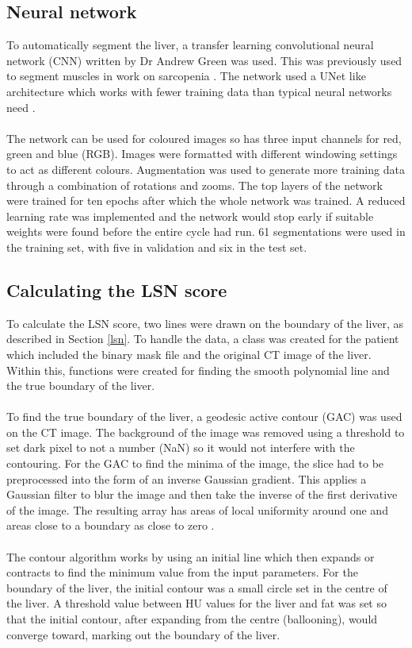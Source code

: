 \documentclass[12pt]{article}
\begin{document}
\subsection{Neural network}
To automatically segment the liver, a transfer learning convolutional neural network (CNN) written by Dr Andrew Green was used. This was previously used to segment muscles in work on sarcopenia \cite{Green:2019aa}. The network used a UNet like architecture which works with fewer training data than typical neural networks need \cite{2015arXiv150504597R}.
\\ \\
The network can be used for coloured images so has three input channels for red, green and blue (RGB). Images were formatted with different windowing settings to act as different colours. Augmentation was used to generate more training data through a combination of rotations and zooms. The top layers of the network were trained for ten epochs after which the whole network was trained. A reduced learning rate was implemented and the network would stop early if suitable weights were found before the entire cycle had run. 61 segmentations were used in the training set, with five in validation and six in the test set. 


\subsection{Calculating the LSN score}
To calculate the LSN score, two lines were drawn on the boundary of the liver, as described in Section \ref{lsn}. To handle the data, a class was created for the patient which included the binary mask file and the original CT image of the liver. Within this, functions were created for finding the smooth polynomial line and the true boundary of the liver.
\\ \\
To find the true boundary of the liver, a geodesic active contour (GAC) was used on the CT image. The background of the image was removed using a threshold to set dark pixel to not a number (NaN) so it would not interfere with the contouring. For the GAC to find the minima of the image, the slice had to be preprocessed into the form of an inverse Gaussian gradient. This applies a Gaussian filter to blur the image and then take the inverse of the first derivative of the image. The resulting array has areas of local uniformity around one and areas close to a boundary as close to zero \cite{inverse_gaussian}.
\\ \\
The contour algorithm works by using an initial line which then expands or contracts to find the minimum value from the input parameters. For the boundary of the liver, the initial contour was a small circle set in the centre of the liver. A threshold value between HU values for the liver and fat was set so that the initial contour, after expanding from the centre (ballooning), would converge toward, marking out the boundary of the liver.
\end{document}
